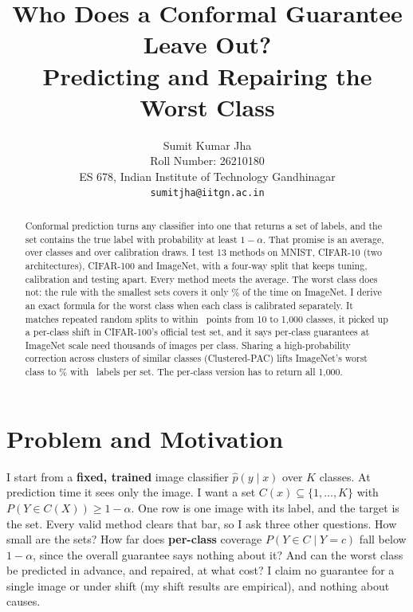 \documentclass{article}
\title{Who Does a Conformal Guarantee Leave Out?\\ Predicting and Repairing the Worst Class}
\author{%
  Sumit Kumar Jha \\
  Roll Number: 26210180 \\
  ES 678, Indian Institute of Technology Gandhinagar \\
  \texttt{sumitjha@iitgn.ac.in}
}
\begin{document}
\maketitle

\begin{abstract}
Conformal prediction turns any classifier into one that returns a set of labels, and the set contains the true label with
probability at least $1-\alpha$. That promise is an average, over classes and over calibration draws. I test 13 methods on MNIST,
CIFAR-10 (two architectures), CIFAR-100 and ImageNet, with a four-way split that keeps tuning, calibration and testing apart. Every
method meets the average. The worst class does not: the rule with the smallest sets covers it only \WorstINetNaiveT\% of the time on ImageNet.
I derive an exact formula for the worst class when each class is calibrated separately. It matches repeated random splits to within \NsMaxErr\ points
from 10 to 1{,}000 classes, it picked up a per-class shift in CIFAR-100's official test set, and it says per-class guarantees at
ImageNet scale need thousands of images per class. Sharing a high-probability correction across clusters of similar classes
(Clustered-PAC) lifts ImageNet's worst class to \WorstINetClusPAC\% with \SizeINetClusPAC\ labels per set. The per-class version has
to return all 1{,}000.
\end{abstract}

\section{Problem and Motivation}
I start from a \textbf{fixed, trained} image classifier $\hat p(y\mid x)$ over $K$ classes. At prediction time it sees only the image.
I want a set $C(x)\subseteq\{1,\dots,K\}$ with $P(Y\in C(X))\ge1-\alpha$. One row is one image with its label, and the target is the
set. Every valid method clears that bar, so I ask three other questions. How small are the sets? How
far does \textbf{per-class} coverage $P(Y\in C\mid Y=c)$ fall below $1-\alpha$, since the overall guarantee says nothing about
it? And can the worst class be predicted in advance, and repaired, at what cost? I claim no guarantee for a single image or under
shift (my shift results are empirical), and nothing about causes.
\end{document}
